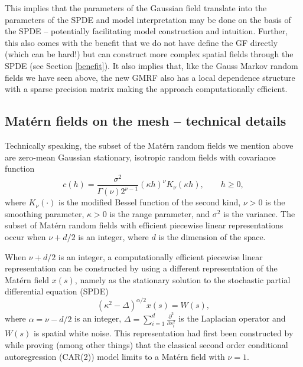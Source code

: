 This implies that the parameters of the Gaussian field translate into the parameters of the SPDE and model interpretation may be done on the basis of the SPDE -- potentially facilitating model construction and intuition.
Further, this also comes with the benefit that we do not have define the GF directly (which can be hard!) but can construct more complex spatial fields through the SPDE (see Section \ref{benefit}). It also implies that, like the Gauss Markov random fields we have seen above, the new GMRF also has a local dependence structure  with a sparse precision matrix making the approach computationally efficient.

\subsection{Mat\'{e}rn fields on the mesh  -- technical details}\label{matern_tech}

Technically speaking, the subset of the Mat\'{e}rn random fields we mention above are zero-mean Gaussian stationary, isotropic random fields with covariance function $$
c(h) = \frac{\sigma^2}{\Gamma(\nu) 2^{\nu-1}}(\kappa h)^\nu K_\nu(\kappa h), \qquad h \geq 0,
$$ where $K_\nu(\cdot)$ is the modified Bessel function of the second kind, $\nu>0$ is the smoothing parameter, $\kappa >0$ is the range parameter, and $\sigma^2$ is the variance. The subset  of Mat\'{e}rn random fields with efficient piecewise linear representations occur when $\nu + d/2$ is an integer, where $d$ is the dimension of the space.

When  $\nu + d/2$ is an integer, a computationally efficient piecewise linear representation can be constructed by using a different representation of the Mat\'{e}rn field $x(s)$, namely as the stationary solution to the stochastic partial differential equation (SPDE) \begin{equation} \label{SPDE}
(\kappa^2 - \Delta)^{\alpha/2} x(s) = W(s),
\end{equation} where $\alpha= \nu - d/2$ is an integer, $\Delta = \sum_{i=1}^d \frac{\partial^2 }{\partial s_i^2}$ is the Laplacian operator and $W(s)$ is spatial white noise.  This representation had first been constructed by \citet{art246,art455} while proving (among other things) that the classical second order conditional autoregression (CAR(2)) model limits to a Mat\'{e}rn field with $\nu = 1$.

